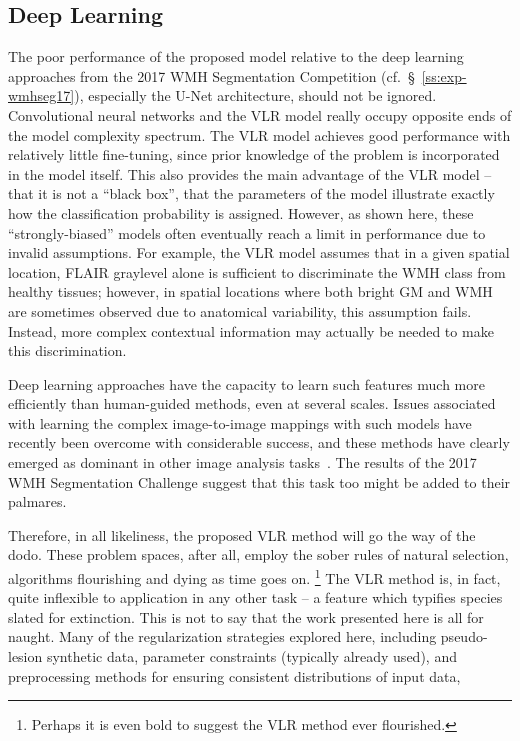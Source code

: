 \subsection{Deep Learning}
The poor performance of the proposed model relative to the deep learning approaches
from the 2017 WMH Segmentation Competition (cf.~\S~\ref{ss:exp-wmhseg17}),
especially the U-Net architecture, should not be ignored.
Convolutional neural networks and the VLR model really occupy opposite ends of the
model complexity spectrum.
The VLR model achieves good performance with relatively little fine-tuning,
since prior knowledge of the problem is incorporated in the model itself.
This also provides the main advantage of the VLR model
-- that it is not a ``black box'', that the parameters of the model
illustrate exactly how the classification probability is assigned.
However, as shown here, these ``strongly-biased'' models
often eventually reach a limit in performance due to invalid assumptions.
For example, the VLR model assumes that in a given spatial location,
FLAIR graylevel alone is sufficient to discriminate the WMH class from healthy tissues;
however, in spatial locations where both bright GM and WMH are sometimes observed
due to anatomical variability, this assumption fails.
Instead, more complex contextual information may actually be needed to
make this discrimination.
\par
Deep learning approaches have the capacity to learn such features
much more efficiently than human-guided methods, even at several scales.
Issues associated with learning the complex image-to-image mappings
with such models have recently been overcome with considerable success,
and these methods have clearly emerged
as dominant in other image analysis tasks~\cite{Ronneberger2015}.
The results of the 2017 WMH Segmentation Challenge suggest that this task too
might be added to their palmares.
\par
Therefore, in all likeliness, the proposed VLR method will go the way of the dodo.
These problem spaces, after all, employ the sober rules of natural selection,
algorithms flourishing and dying as time goes on.%
\footnote{Perhaps it is even bold to suggest the VLR method ever flourished.}
The VLR method is, in fact, quite inflexible to application in any other task --
a feature which typifies species slated for extinction.
This is not to say that the work presented here is all for naught.
Many of the regularization strategies explored here,
including pseudo-lesion synthetic data,
parameter constraints (typically already used),
and preprocessing methods for ensuring consistent distributions of input data,
